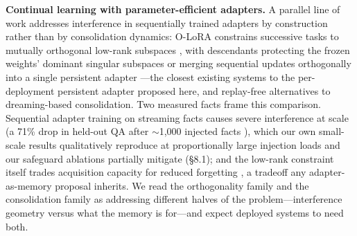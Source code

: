 \documentclass[11pt]{article}
\begin{document}
\textbf{Continual learning with parameter-efficient adapters.} A parallel line of work addresses interference in sequentially trained adapters by construction rather than by consolidation dynamics: O-LoRA constrains successive tasks to mutually orthogonal low-rank subspaces \cite{olora2023}, with descendants protecting the frozen weights' dominant singular subspaces \cite{oplora2025} or merging sequential updates orthogonally into a single persistent adapter \cite{mbf2025}---the closest existing systems to the per-deployment persistent adapter proposed here, and replay-free alternatives to dreaming-based consolidation. Two measured facts frame this comparison. Sequential adapter training on streaming facts causes severe interference at scale (a 71\% drop in held-out QA after $\sim$1{,}000 injected facts \cite{lin2025sparse}), which our own small-scale results qualitatively reproduce at proportionally large injection loads and our safeguard ablations partially mitigate (\S 8.1); and the low-rank constraint itself trades acquisition capacity for reduced forgetting \cite{biderman2024}, a tradeoff any adapter-as-memory proposal inherits. We read the orthogonality family and the consolidation family as addressing different halves of the problem---interference geometry versus what the memory is for---and expect deployed systems to need both.
\end{document}
